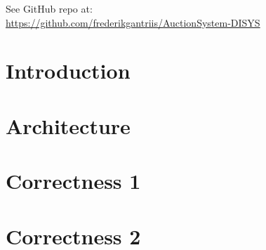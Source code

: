 \documentclass[a4paper, 11pt]{article}
\begin{document}
\maketitle
\begin{center}See GitHub repo at:\\
{\Large \url{https://github.com/frederikgantriis/AuctionSystem-DISYS}}
\end{center}

\section{Introduction}

\section{Architecture}

\section{Correctness 1}

\section{Correctness 2}
\end{document}
